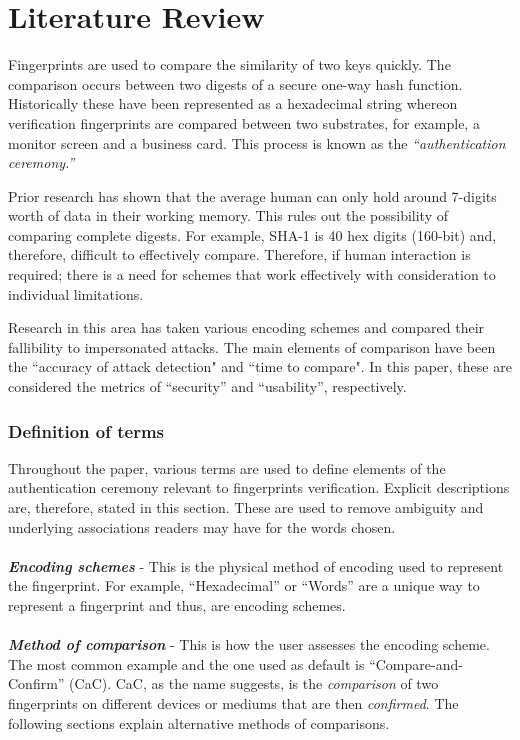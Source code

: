 \chapter{Literature Review}
\label{cha:LiteratureReview}

Fingerprints are used to compare the similarity of two keys quickly. The comparison occurs between two digests of a secure one-way hash function. Historically these have been represented as a hexadecimal string whereon verification fingerprints are compared between two substrates, for example, a monitor screen and a business card.
This process is known as the \textit{``authentication ceremony.''}

Prior research has shown that the average human can only hold around 7-digits worth of data in their working memory\cite{miller1956magical}. This rules out the possibility of comparing complete digests. For example, SHA-1 is 40 hex digits (160-bit) and, therefore, difficult to effectively compare. Therefore, if human interaction is required; there is a need for schemes that work effectively with consideration to individual limitations.

Research in this area has taken various encoding schemes and compared their fallibility to impersonated attacks. The main elements of comparison have been the ``accuracy of attack detection" and ``time to compare". In this paper, these are considered the metrics of ``security'' and ``usability'', respectively.

\subsection*{Definition of terms}
Throughout the paper, various terms are used to define elements of the authentication ceremony relevant to fingerprints verification. Explicit descriptions are, therefore, stated in this section. These are used to remove ambiguity and underlying associations readers may have for the words chosen.
\\\\
\textbf{\textit{Encoding schemes}} - This is the physical method of encoding used to represent the fingerprint. For example, ``Hexadecimal'' or ``Words'' are a unique way to represent a fingerprint and thus, are encoding schemes.
\\\\
\textbf{\textit{Method of comparison}} - This is how the user assesses the encoding scheme. The most common example and the one used as default is ``Compare-and-Confirm'' (CaC). CaC, as the name suggests, is the \textit{comparison} of two fingerprints on different devices or mediums that are then \textit{confirmed}. The following sections explain alternative methods of comparisons.

